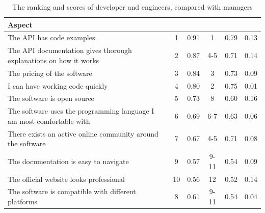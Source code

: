 \documentclass{cslthse-msc}
\begin{document}
    \begin{table}[H]
        \centering
        \caption{The ranking and scores of developer and engineers, compared with managers}
        \label{tab:arch-devs}
        \begin{tabularx}{\columnwidth}{X|c:c|c:c|c|}

            \textbf{Aspect}                                                    &     & &   & & \\ \hline
            The API has code examples                                             &               1 & 0.91       &            1 & 0.79           & 0.13  \\ \hline
            The API documentation gives thorough explanations on how it works     &               2 & 0.87       &          4-5 & 0.71           & 0.14  \\ \hline
            The pricing of the software                                           &               3 & 0.84       &            3 & 0.73           & 0.09  \\ \hline
            I can have working code quickly                                       &               4 & 0.80       &            2 & 0.75           & 0.01  \\ \hline
            The software is open source                                           &               5 & 0.73       &            8 & 0.60           & 0.16  \\ \hline
            The software uses the programming language I am most comfortable with &               6 & 0.69       &          6-7 & 0.63           & 0.06  \\ \hline
            There exists an active online community around the software           &               7 & 0.67       &          4-5 & 0.71           & 0.08  \\ \hline
            The documentation is easy to navigate                                 &               9 & 0.57       &         9-11 & 0.54           & 0.09  \\ \hline
            The official website looks professional                               &              10 & 0.56       &           12 & 0.52           & 0.14  \\ \hline
            The software is compatible with different platforms                   &               8 & 0.61       &         9-11 & 0.54           & 0.04  \\ \hline

\end{tabularx}
\end{table}
\end{document}
